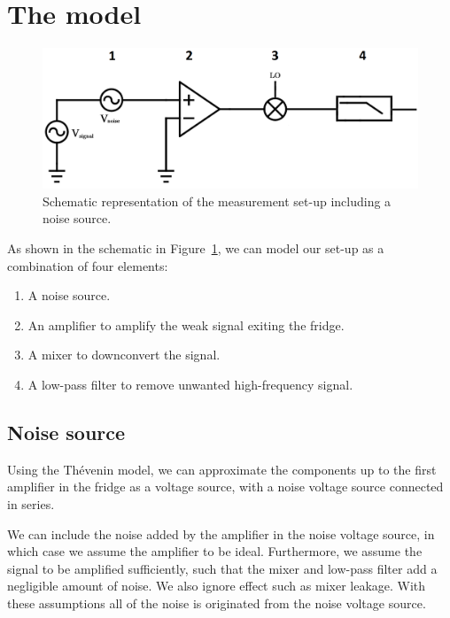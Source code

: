 \documentclass[12pt]{report}
\begin{document}
\newpage
\section{The model}

\begin{figure}
    \centering
    \includegraphics[width=.8\textwidth]{Figures/Noise model.png}
    \caption{Schematic representation of the measurement set-up including a noise source.}
    \label{fig:noise model}
\end{figure}


As shown in the schematic in Figure~\ref{fig:noise model}, we can model our set-up as a combination of four elements:

\begin{enumerate}
    \item A noise source.
    \item An amplifier to amplify the weak signal exiting the fridge.
    \item A mixer to downconvert the signal.
    \item A low-pass filter to remove unwanted high-frequency signal.
\end{enumerate}



\subsection{Noise source}

Using the Th\'evenin model, we can approximate the components up to the first amplifier in the fridge as a voltage source, with a noise voltage source connected in series.

We can include the noise added by the amplifier in the noise voltage source, in which case we assume the amplifier to be ideal. Furthermore, we assume the signal to be amplified sufficiently, such that the mixer and low-pass filter add a negligible amount of noise. We also ignore effect such as mixer leakage. With these assumptions all of the noise is originated from the noise voltage source.
\end{document}
